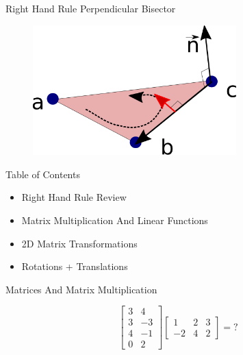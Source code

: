 \documentclass{beamer}
\begin{document}
\begin{frame}{Right Hand Rule Perpendicular Bisector}

\begin{figure}[t]
	\centering
    \includegraphics[width=0.7\textwidth]{3DTriangle3.pdf}
\end{figure}

\end{frame}

\begin{frame}{Table of Contents}

\begin{itemize}[label=$\vartriangleright$]
	\item Right Hand Rule Review
\end{itemize}
\begin{itemize}[label=$\blacktriangleright$]
    \item Matrix Multiplication And Linear Functions
\end{itemize}
\begin{itemize}[label=$\vartriangleright$]
    \item 2D Matrix Transformations
    \item Rotations + Translations
    
\end{itemize}

\end{frame}


\begin{frame}{Matrices And Matrix Multiplication}

\[ \left[ \begin{array}{cc} 3 & 4  \\ 3 & -3  \\ 4 & -1  \\ 0 & 2 \end{array} \right]  \left[ \begin{array}{ccc} 1 & 2 & 3  \\ -2 & 4 & 2 \end{array} \right]   =  ?  \]


\end{frame}
\end{document}
